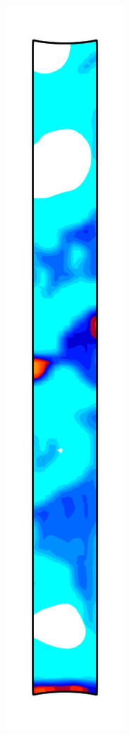\begin{figure}[!htb]
\begin{subfigure}{0.08\textwidth}
  \end{subfigure}
  \begin{subfigure}{0.08\textwidth}
    \centering
    \includegraphics[width=\textwidth]{Chapter5/figures/spallation/c_7}

\end{subfigure}
\end{figure}
